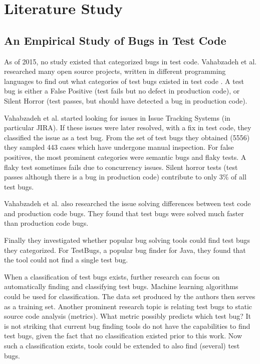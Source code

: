 \documentclass{uvamscse}
\newcommand{\Atestbugs}{Vahabzadeh et al.}
\begin{document}
\chapter{Literature Study}

\section{An Empirical Study of Bugs in Test Code}
As of 2015, no study existed that categorized bugs in test code. \Atestbugs{} researched many open source projects, written in different programming languages to find out what categories of test bugs existed in test code \cite{vahabzadeh2015empirical}. A test bug is either a False Positive (test fails but no defect in production code), or Silent Horror (test passes, but should have detected a bug in production code). 

\Atestbugs{} started looking for issues in Issue Tracking Systems (in particular JIRA). If these issues were later resolved, with a fix in test code, they classified the issue as a test bug. From the set of test bugs they obtained (5556) they sampled 443 cases which have undergone manual inspection. For false positives, the most prominent categories were semantic bugs and flaky tests. A flaky test sometimes fails due to concurrency issues. Silent horror tests (test passes although there is a bug in production code) contribute to only 3\% of all test bugs. 

\Atestbugs{} also researched the issue solving differences between test code and production code bugs. They found that test bugs were solved much faster than production code bugs. 

Finally they investigated whether popular bug solving tools could find test bugs they categorized. For TestBugs, a popular bug finder for Java, they found that the tool could not find a single test bug.

When a classification of test bugs exists, further research can focus on automatically finding and classifying test bugs. Machine learning algorithms could be used for classification. The data set produced by the authors then serves as a training set. Another prominent research topic is relating test bugs to static source code analysis (metrics). What metric possibly predicts which test bug? It is not striking that current bug finding tools do not have the capabilities to find test bugs, given the fact that no classification existed prior to this work. Now such a classification exists, tools could be extended to also find (several) test bugs.
\end{document}
